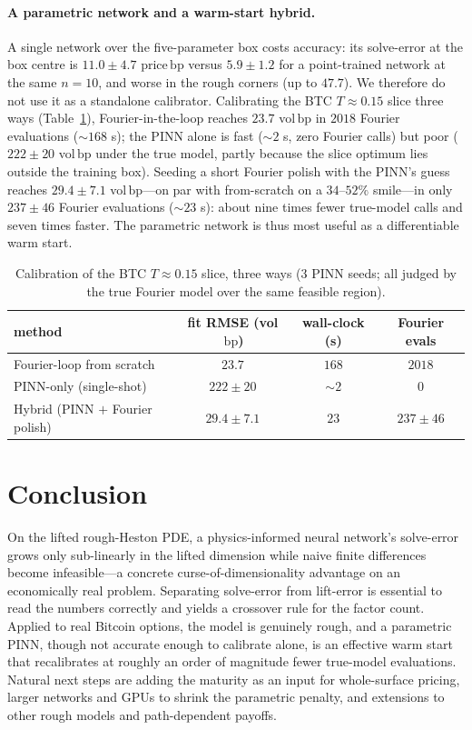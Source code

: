 \documentclass[11pt]{article}
\newcommand{\bp}{\ensuremath{\,\mathrm{bp}}}
\begin{document}
\paragraph{A parametric network and a warm-start hybrid.}
A single network over the five-parameter box costs accuracy: its solve-error at the
box centre is $11.0\pm4.7$ price\bp{} versus $5.9\pm1.2$ for a point-trained network
at the same $n=10$, and worse in the rough corners (up to $47.7$). We therefore do
not use it as a standalone calibrator. Calibrating the BTC $T\approx0.15$ slice
three ways (Table~\ref{tab:calib}), Fourier-in-the-loop reaches $23.7$ vol\bp{} in
$2018$ Fourier evaluations ($\sim\!168$ s); the PINN alone is fast ($\sim\!2$ s,
zero Fourier calls) but poor ($222\pm20$ vol\bp{} under the true model, partly
because the slice optimum lies outside the training box). Seeding a short Fourier
polish with the PINN's guess reaches $29.4\pm7.1$ vol\bp{}---on par with
from-scratch on a $34$--$52\%$ smile---in only $237\pm46$ Fourier evaluations
($\sim\!23$ s): about nine times fewer true-model calls and seven times faster. The
parametric network is thus most useful as a differentiable warm start.

\begin{table}[t]\centering
\caption{Calibration of the BTC $T\approx0.15$ slice, three ways (3 PINN seeds; all
judged by the true Fourier model over the same feasible region).}
\label{tab:calib}
\begin{tabular}{lccc}
\toprule
method & fit RMSE (vol\bp) & wall-clock (s) & Fourier evals\\
\midrule
Fourier-loop from scratch        & $23.7$       & $168$   & $2018$\\
PINN-only (single-shot)          & $222\pm20$   & $\sim2$ & $0$\\
Hybrid (PINN $+$ Fourier polish) & $29.4\pm7.1$ & $23$    & $237\pm46$\\
\bottomrule
\end{tabular}
\end{table}

\section{Conclusion}
On the lifted rough-Heston PDE, a physics-informed neural network's solve-error
grows only sub-linearly in the lifted dimension while naive finite differences
become infeasible---a concrete curse-of-dimensionality advantage on an
economically real problem. Separating solve-error from lift-error is essential to
read the numbers correctly and yields a crossover rule for the factor count.
Applied to real Bitcoin options, the model is genuinely rough, and a parametric
PINN, though not accurate enough to calibrate alone, is an effective warm start
that recalibrates at roughly an order of magnitude fewer true-model evaluations.
Natural next steps are adding the maturity as an input for whole-surface pricing,
larger networks and GPUs to shrink the parametric penalty, and extensions to other
rough models and path-dependent payoffs.



\end{document}
